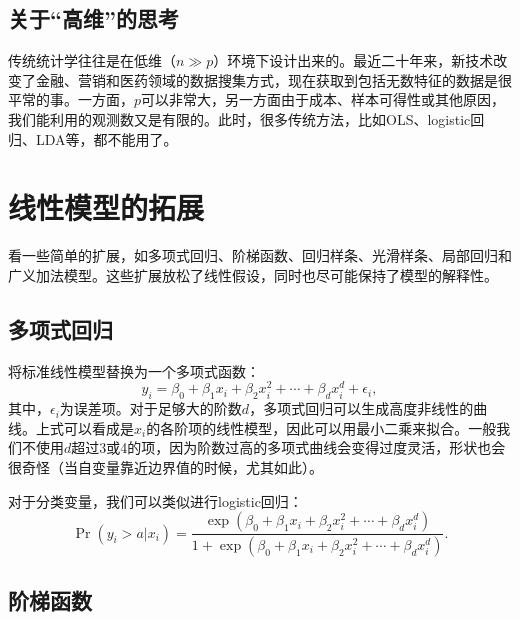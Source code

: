 \documentclass[hyperref,]{ctexart}
\begin{document}
\subsection{\texorpdfstring{关于``高维''的思考}{关于高维的思考}}

传统统计学往往是在低维（\(n\gg p\)）环境下设计出来的。最近二十年来，新技术改变了金融、营销和医药领域的数据搜集方式，现在获取到包括无数特征的数据是很平常的事。一方面，\(p\)可以非常大，另一方面由于成本、样本可得性或其他原因，我们能利用的观测数又是有限的。此时，很多传统方法，比如OLS、logistic回归、LDA等，都不能用了。

\section{线性模型的拓展}\label{-1}

看一些简单的扩展，如多项式回归、阶梯函数、回归样条、光滑样条、局部回归和广义加法模型。这些扩展放松了线性假设，同时也尽可能保持了模型的解释性。

\subsection{多项式回归}

将标准线性模型替换为一个多项式函数：
\[y_i=\beta_0+\beta_1x_i+\beta_2x_i^2+\cdots+\beta_dx_i^d+\epsilon_i,\]
其中，\(\epsilon_i\)为误差项。对于足够大的阶数\(d\)，多项式回归可以生成高度非线性的曲线。上式可以看成是\(x_i\)的各阶项的线性模型，因此可以用最小二乘来拟合。一般我们不使用\(d\)超过3或4的项，因为阶数过高的多项式曲线会变得过度灵活，形状也会很奇怪（当自变量靠近边界值的时候，尤其如此）。

对于分类变量，我们可以类似进行logistic回归：
\[\Pr(y_i>a|x_i)=\frac{\exp\left(\beta_0+\beta_1x_i+\beta_2x_i^2+\cdots+\beta_dx_i^d\right)}{1+\exp\left(\beta_0+\beta_1x_i+\beta_2x_i^2+\cdots+\beta_dx_i^d\right)}.\]

\subsection{阶梯函数}
\end{document}
